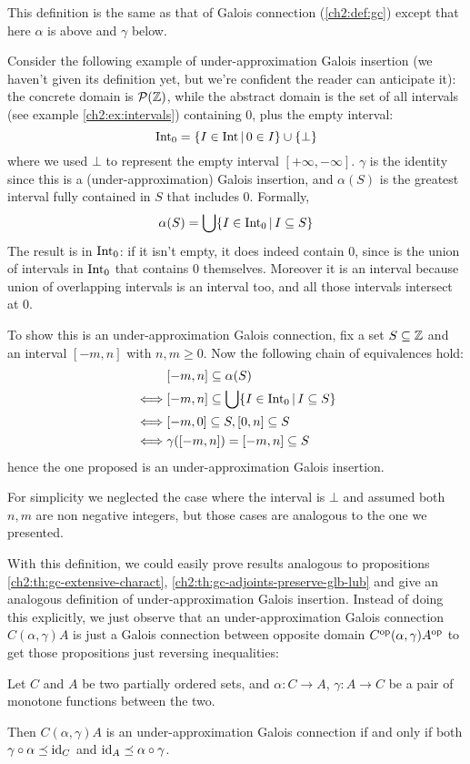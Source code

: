 This definition is the same as that of Galois connection (\ref{ch2:def:gc}) except that here $\alpha$ is above and $\gamma$ below.
\begin{example}\label{ch2:ex:intervals-0}
	Consider the following example of under-approximation Galois insertion (we haven't given its definition yet, but we're confident the reader can anticipate it): the concrete domain is $\mathcal{P}(\mathbb{Z})$, while the abstract domain is the set of all intervals (see example \ref{ch2:ex:intervals}) containing $0$, plus the empty interval:
	\[
	\text{Int}_0 = \{ I \in \text{Int} \,\vert\, 0 \in I \} \cup \{ \bot \}
	\]
	where we used $\bot$ to represent the empty interval $[+\infty, -\infty]$.
	$\gamma$ is the identity since this is a (under-approximation) Galois insertion, and $\alpha(S)$ is the greatest interval fully contained in $S$ that includes $0$. Formally,
	\begin{align*}
		\alpha(S) = \bigcup \{ I \in \text{Int}_0 \,\vert\, I \subseteq S \}
	\end{align*}
	The result is in $\text{Int}_0$: if it isn't empty, it does indeed contain $0$, since is the union of intervals in $\text{Int}_0$ that contains $0$ themselves. Moreover it is an interval because union of overlapping intervals is an interval too, and all those intervals intersect at $0$.

	To show this is an under-approximation Galois connection, fix a set $S \subseteq \mathbb{Z}$ and an interval $[-m, n]$ with $n, m \ge 0$.
	Now the following chain of equivalences hold:
	\begin{align*}
		&[-m, n] \subseteq \alpha(S) \\
		\iff &[-m, n] \subseteq \bigcup \{ I \in \text{Int}_0 \,\vert\, I \subseteq S \} \\
		\iff &[-m, 0] \subseteq S, [0, n] \subseteq S \\
		\iff &\gamma([-m, n]) = [-m, n] \subseteq S
	\end{align*}
	hence the one proposed is an under-approximation Galois insertion.

	For simplicity we neglected the case where the interval is $\bot$ and assumed both $n, m$ are non negative integers, but those cases are analogous to the one we presented.
\end{example}
With this definition, we could easily prove results analogous to propositions \ref{ch2:th:gc-extensive-charact}, \ref{ch2:th:gc-adjoints-preserve-glb-lub} and give an analogous definition of under-approximation Galois insertion.
Instead of doing this explicitly, we just observe that an under-approximation Galois connection $C (\alpha, \gamma) A$ is just a Galois connection between opposite domain $C^{\text{op}} (\alpha, \gamma) A^{\text{op}}$ to get those propositions just reversing inequalities:
\begin{prop}\label{ch2:th:under-gc-extensive-charact}
	Let $C$ and $A$ be two partially ordered sets, and $\alpha : C \rightarrow A$, $\gamma : A \rightarrow C$ be a pair of monotone functions between the two.

	Then $C (\alpha, \gamma) A$ is an under-approximation Galois connection if and only if both $\gamma \circ \alpha \preceq \text{id}_C$ and $\text{id}_A \preceq \alpha \circ \gamma$.
\end{prop}

